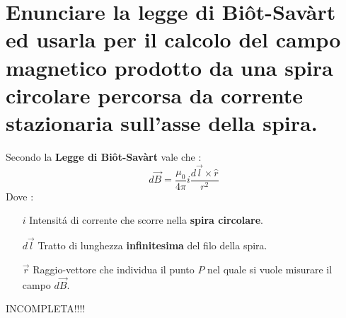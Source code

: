 \section{Enunciare la legge di Bi\^ot-Sav\`art ed usarla per il
	calcolo del campo magnetico prodotto da una spira circolare
	percorsa da corrente stazionaria sull'asse della spira.}
Secondo la \textbf{Legge di Bi\^ot-Sav\`art} vale che :
$$
    d\vec{B} = \frac{\mu_0}{4 \pi} i \frac{d\vec{l} \times \hat{r}}{r^2}
$$
Dove : 
\begin{itemize}
	\item [$i$] {
	    Intensit\'a di corrente che scorre nella \textbf{spira circolare}.	
	}
	\item[$d\vec{l}$] {
	    Tratto di lunghezza \textbf{infinitesima} del filo della spira.
	}
	\item[$\vec{r}$] {
	    Raggio-vettore che individua il punto $P$ nel quale si vuole misurare il campo $d\vec{B}$.	
	}
\end{itemize}
INCOMPLETA!!!!